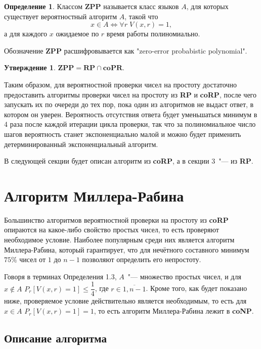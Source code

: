 \documentclass[12pt]{article}
\theoremstyle{definition}
\newtheorem{Def}{Определение}
\newtheorem{St}{Утверждение}
\numberwithin{Def}{section}
\numberwithin{Th}{section}
\numberwithin{St}{section}
\begin{document}
\begin{Def}
	Классом \textbf{ZPP} называется класс языков $A$, для которых существует
	вероятностный алгоритм $A$, такой что
	$$
	x\in A\iff\forall r\; V(x,r)=1,
	$$
	а для каждого $x$ ожидаемое по $r$ время работы полиномиально.
\end{Def}

Обозначение \textbf{ZPP} расшифровывается как "zero-error probabistic
polynomial".

\begin{St}
$\mathbf{ZPP=RP\cap coPR}$.
\end{St}

Таким образом, для вероятностной проверки чисел на простоту достаточно
предоставить алгоритмы проверки чисел на простоту из \textbf{RP} и \textbf{coRP},
после чего запускать их по очереди до тех пор, пока один из алгоритмов
не выдаст ответ, в котором он уверен. Вероятность отсутствия ответа будет
уменьшаться минимум в 4 раза после каждой итерации цикла проверки, так что
за полиномиальное число шагов вероятность станет экспоненциально малой и можно
будет применить детерминированный экспоненциальный алгоритм.

В следующей секции будет описан алгоритм из \textbf{coRP}, а в секции 3~"--- из
\textbf{RP}.

\section{Алгоритм Миллера-Рабина}

Большинство алгоритмов вероятностной проверки на простоту из \textbf{coRP}
опираются на какое-либо свойство простых чисел, то есть проверяют необходимое
условие. Наиболее популярным среди них является алгоритм Миллера-Рабина, который
гарантирует, что для нечётного составного минимум $75\%$ чисел от $1$ до $n-1$
позволяют определить его непростоту.

Говоря в терминах Определения 1.3,
$A$~"--- множество простых чисел, и для
$x\notin A$ $P_r[V(x,r)=1]\leqslant\dfrac 14$, где $r\in\overline{1,n-1}$.
Кроме того, как будет показано ниже, проверяемое условие действительно
является необходимым, то есть для $x\in A$ $P_r[V(x,r)=1]=1$, то есть
алгоритм Миллера-Рабина лежит в \textbf{coNP}.

\subsection{Описание алгоритма}
\newcommand{\Mod}[1]{\ \mathrm{mod}\ #1}
\end{document}
